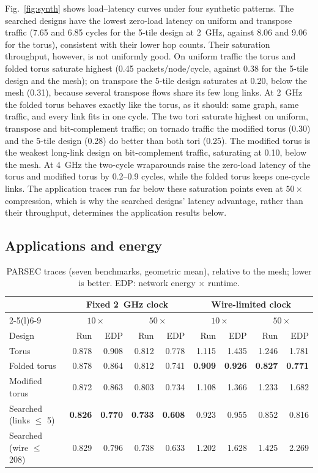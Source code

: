 \documentclass[preprint,12pt,a4paper]{elsarticle}
\begin{document}
Fig.~\ref{fig:synth} shows load--latency curves under four synthetic
patterns. The searched designs have the lowest zero-load latency on uniform
and transpose traffic (7.65 and 6.85 cycles for the 5-tile design at
2~GHz, against 8.06 and 9.06 for the torus), consistent with their lower hop
counts. Their saturation throughput, however, is not uniformly good. On
uniform traffic the torus and folded torus saturate highest (0.45
packets/node/cycle, against 0.38 for the 5-tile design and the mesh); on
transpose the 5-tile design saturates at 0.20, below the mesh (0.31),
because several transpose flows share its few long links. At 2~GHz the
folded torus behaves exactly like the torus, as it should: same graph, same
traffic, and every link fits in one cycle. The two tori saturate highest on
uniform, transpose and bit-complement traffic; on tornado traffic the
modified torus (0.30) and the 5-tile design (0.28) do better than both tori
(0.25). The modified torus is the weakest long-link design on
bit-complement traffic, saturating at 0.10, below the mesh. At 4~GHz the
two-cycle wraparounds raise the zero-load latency of the torus and modified
torus by 0.2--0.9 cycles, while the folded torus keeps one-cycle links. The application traces run
far below these saturation points even at $50\times$ compression, which is
why the searched designs' latency advantage, rather than their throughput,
determines the application results below.

\subsection{Applications and energy}
\label{sec:res-apps}

\begin{table}[t]
\centering
\caption{PARSEC traces (seven benchmarks, geometric mean), relative to the
mesh; lower is better. EDP: network energy $\times$ runtime.}
\label{tab:apps}
\small
\begin{tabular}{@{}lrrrrrrrr@{}}
\toprule
 & \multicolumn{4}{c}{Fixed 2~GHz clock} & \multicolumn{4}{c}{Wire-limited clock} \\
\cmidrule(lr){2-5}\cmidrule(l){6-9}
 & \multicolumn{2}{c}{$10\times$} & \multicolumn{2}{c}{$50\times$} & \multicolumn{2}{c}{$10\times$} & \multicolumn{2}{c}{$50\times$} \\
Design & Run & EDP & Run & EDP & Run & EDP & Run & EDP \\
\midrule
Torus                     & 0.878 & 0.908 & 0.812 & 0.778 & 1.115 & 1.435 & 1.246 & 1.781 \\
Folded torus              & 0.878 & 0.864 & 0.812 & 0.741 & \textbf{0.909} & \textbf{0.926} & \textbf{0.827} & \textbf{0.771} \\
Modified torus            & 0.872 & 0.863 & 0.803 & 0.734 & 1.108 & 1.366 & 1.233 & 1.682 \\
Searched (links $\le$ 5)  & \textbf{0.826} & \textbf{0.770} & \textbf{0.733} & \textbf{0.608} & 0.923 & 0.955 & 0.852 & 0.816 \\
Searched (wire $\le$ 208) & 0.829 & 0.796 & 0.738 & 0.633 & 1.202 & 1.628 & 1.425 & 2.269 \\
\bottomrule
\end{tabular}
\end{table}
\end{document}
